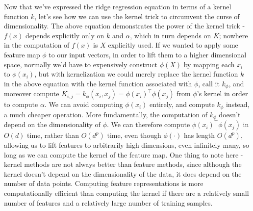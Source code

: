 \documentclass{article}
\begin{document}
Now that we've expressed the ridge regression equation in terms of a kernel function $ k $, let's see how we can use the kernel trick to circumvent the curse of dimensionality. The above equation demonstrates the power of the kernel trick - $ f(x) $ depends explicitly only on $ k $ and $ \alpha $, which in turn depends on $ K $; nowhere in the computation of $ f(x) $ is $ X $ explicitly used. If we wanted to apply some feature map $ \phi $ to our input vectors, in order to lift them to a higher dimensional space, normally we'd have to expensively construct $ \phi(X) $ by mapping each $ x_i $ to $ \phi(x_i) $, but with kernelization we could merely replace the kernel function $ k $ in the above equation with the kernel function associated with $ \phi $, call it $ k_{\phi} $, and moreover compute $ K_{i, j} = k_{\phi}(x_i, x_j) = \phi(x_i)^\intercal \phi(x_j) $ from $ \phi $'s kernel in order to compute $ \alpha $. We can avoid computing $ \phi(x_i) $ entirely, and compute $ k_\phi $ instead, a much cheaper operation. More fundamentally, the computation of $ k_\phi $ doesn't depend on the dimensionality of $ \phi $. We can therefore compute $ \phi(x_i)^\intercal \phi(x_j) $ in $ O(d) $ time, rather than $ O(d^p) $ time, even though $ \phi(\cdot) $ has length $ O(d^p) $, allowing us to lift features to arbitrarily high dimensions, even infinitely many, so long as we can compute the kernel of the feature map. One thing to note here - kernel methods are not always better than feature methods, since although the kernel doesn't depend on the dimensionality of the data, it does depend on the number of data points. Computing feature representations is more computationally efficient than computing the kernel if there are a relatively small number of features and a relatively large number of training samples.
\end{document}
